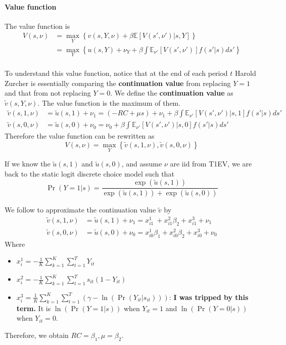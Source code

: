\documentclass[12pt]{article}[margin=1in]
\begin{document}
\paragraph{Value function} The value function is
\begin{equation*}
    \begin{split}
        V(s, \nu) & = \max_{Y} \left\{ v(s,Y,\nu) + \beta \mathbb{E}[V(s', \nu')|s,Y] \right\}                       \\
                  & = \max_{Y} \left\{ u(s,Y)+\nu_Y + \beta \int \mathbb{E}_{\nu'}[V(s', \nu')] f(s'|s) ds' \right\} \\
    \end{split}
\end{equation*}

To understand this value function, notice that at the end of each period $t$
Harold Zurcher is essentially comparing the \textbf{continuation value} from
replacing $Y=1$ and that from not replacing $Y=0$. We define the
\textbf{continuation value} as $\tilde{v}(s,Y,\nu)$. The value function is the
maximum of them.
\begin{align*}
    \tilde{v}(s,1,\nu) & = \tilde{u}(s,1) + \nu_1=  (-RC + \mu s) +\nu_1 + \beta \int \mathbb{E}_{\nu'}[V(s', \nu')|s,1] f(s'|s) ds' \\
    \tilde{v}(s,0,\nu) & = \tilde{u}(s,0)+\nu_0 = \nu_0+\beta \int \mathbb{E}_{\nu'}[V(s', \nu')|s,0] f(s'|s) ds'
\end{align*}
Therefore the value function can be rewritten as
\begin{equation*}
    V(s, \nu) = \max_Y\left\{ \tilde{v}(s,1,\nu), \tilde{v}(s,0,\nu) \right\}
\end{equation*}

If we know the $\tilde{u}(s,1)$ and $\tilde{u}(s,0)$, and assume $\nu$ are iid
from T1EV, we are back to the static logit discrete choice model such that
\begin{equation*}
    \Pr(Y=1|s) = \frac{\exp(\tilde{u}(s,1))}{\exp(\tilde{u}(s,1)) + \exp(\tilde{u}(s,0))}
\end{equation*}

We follow \citet{bajari2007estimating} to approximate the continuation value
$\tilde{v}$ by
\begin{align*}
    \tilde{v}(s,1,\nu) & = \tilde{u}(s,1) + \nu_1 = x_{i1}^1\ + x_{i1}^2\beta_2 + x_{i1}^3+ \nu_1     \\
    \tilde{v}(s,0,\nu) & = \tilde{u}(s,0) +\nu_0 = x_{i0}^1\beta_1 + x_{i0}^2\beta_2 + x_{i0}^3+\nu_0
\end{align*}
Where
\begin{itemize}
    \item $x_{i}^1 = -\frac{1}{K}\sum_{k=1}^K \sum_{t=1}^T Y_{it}$
    \item $x_{i}^2 = -\frac{1}{K}\sum_{k=1}^K \sum_{t=1}^T s_{it}(1-Y_{it})$
    \item $x_{i}^3 = \frac{1}{K}\sum_{k=1}^K \sum_{t=1}^T (\gamma-\ln(\Pr(Y_{it}|s_{it})))$: \textbf{I was tripped by this term.} It is $\ln(\Pr(Y=1|s))$ when $Y_{it}=1$ and $\ln(\Pr(Y=0|s))$ when $Y_{it}=0$.
\end{itemize}
Therefore, we obtain $RC=\beta_1, \mu=\beta_2$.
\end{document}
